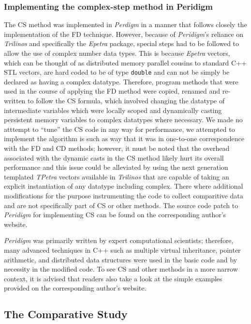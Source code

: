 \documentclass[preprint,12pt]{elsarticle}
\begin{document}
\subsubsection{Implementing the complex-step method in Peridigm} 
%
The CS method was implemented in \emph{Perdigm} in a manner that follows closely the implementation of the FD technique.  However, because of \emph{Peridigm}'s reliance on \emph{Trilinos} and specifically the \emph{Epetra} package, special steps had to be followed to allow the use of complex number data types.  This is because \emph{Epetra} vectors, which can be thought of as distributed memory parallel cousins to standard C++ STL vectors, are hard coded to be of type {\tt double} and can not be simply be declared as having a complex datatype. Therefore, program methods that were used in the course of applying the FD method were copied, renamed and re-written to follow the CS formula, which involved changing the datatype of intermediate variables which were locally scoped and dynamically casting persistent memory variables to complex datatypes where necessary. We made no atttempt to ``tune'' the CS code in any way for performance, we attempted to implement the algorithm is such as way that it was in one-to-one correspondence with the FD and CD methods; however, it must be noted that the overhead associated with the dynamic casts in the CS method likely hurt its overall performance and this issue could be alleviated by using the next generation templated \emph{TPetra} vectors available in \emph{Trilinos} that are capable of taking an explicit instantiation of any datatype including complex.  There where additional modifications for the purpose instrumenting the code to collect comparitive data and are not specifically part of CS or other methods. The source code patch to \emph{Peridigm} for implementing CS can be found on the corresponding author's website.  

\emph{Peridigm} was primarily written by expert computational scientists; therefore, many advanced techniques in C++ such as multiple virtual inheritance, pointer arithmetic, and distributed data structures were used in the basic code and by necessity in the modified code.  To see CS and other methods in a more narrow context, it is advised that readers also take a look at the simple examples provided on the corresponding author's website.

\subsection{The Comparative Study} 
\label{tcs}
\end{document}
